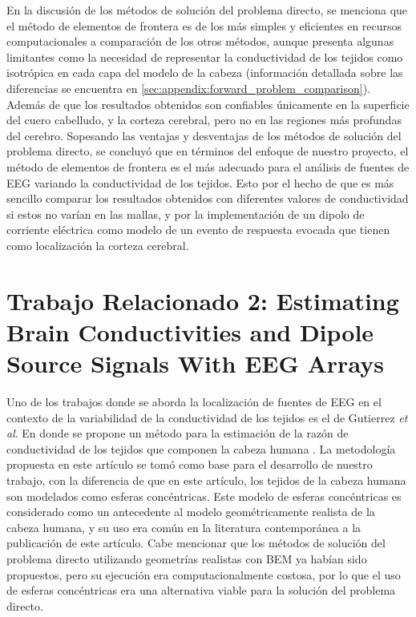 En la discusión de los métodos de solución del problema directo, se menciona que el método de elementos de frontera es de los más simples y eficientes en recursos computacionales a comparación de los otros métodos, aunque presenta algunas limitantes como la necesidad de representar la conductividad de los tejidos como isotrópica en cada capa del modelo de la cabeza (información detallada sobre las diferencias se encuentra en \cref{sec:appendix:forward_problem_comparison}).
Además de que los resultados obtenidos son confiables únicamente en la superficie del cuero cabelludo, y la corteza cerebral, pero no en las regiones más profundas del cerebro. Sopesando las ventajas y desventajas de los métodos de solución del problema directo, se concluyó que en términos del enfoque de nuestro proyecto, el método de elementos de frontera es el más adecuado para el análisis de fuentes de EEG variando la conductividad de los tejidos.
Esto por el hecho de que es más sencillo  comparar los resultados obtenidos con diferentes valores de conductividad si estos no varían en las mallas, y por la implementación de un dipolo de corriente eléctrica como modelo de un evento de respuesta evocada que tienen como localización la corteza cerebral.

\section{Trabajo Relacionado 2: Estimating Brain Conductivities and Dipole Source Signals With EEG Arrays}
\label{sec:related:gutierrez}

Uno de los trabajos donde se aborda la localización de fuentes de EEG en el contexto de la variabilidad de la conductividad de los tejidos es el de Gutierrez \emph{et al}. En donde se propone un método para la estimación de la razón de conductividad de los tejidos que componen la cabeza humana \cite{Gutierrez2004}.
La metodología propuesta en este artículo se tomó como base para el desarrollo de nuestro trabajo, con la diferencia de que en este artículo, los tejidos de la cabeza humana son modelados como esferas concéntricas.
Este modelo de esferas concéntricas es considerado como un antecedente al modelo geométricamente realista de la cabeza humana, y su uso era común en la literatura contemporánea a la publicación de este artículo.
Cabe mencionar que los métodos de solución del problema directo utilizando geometrías realistas con BEM ya habían sido propuestos, pero su ejecución era computacionalmente costosa, por lo que el uso de esferas concéntricas era una alternativa viable para la solución del problema directo.

